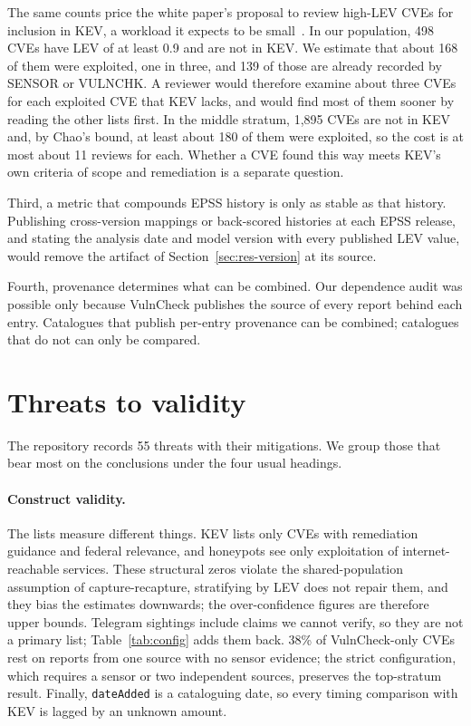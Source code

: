 The same counts price the white paper's proposal to review high-LEV CVEs for
inclusion in KEV, a workload it expects to be
small~\cite[Sec.~3.3]{mell2025lev}. In our population, 498 CVEs have LEV of at
least 0.9 and are not in KEV. We estimate that about 168 of them were
exploited, one in three, and 139 of those are already recorded by SENSOR or
VULNCHK. A reviewer would therefore examine about three CVEs for each exploited
CVE that KEV lacks, and would find most of them sooner by reading the other
lists first. In the middle stratum, 1,895 CVEs are not in KEV and, by Chao's
bound, at least about 180 of them were exploited, so the cost is at most about
11 reviews for each. Whether a CVE found this way meets KEV's own criteria of
scope and remediation is a separate question.

Third, a metric that compounds EPSS history is only as stable as that history.
Publishing cross-version mappings or back-scored histories at each EPSS release,
and stating the analysis date and model version with every published LEV value,
would remove the artifact of Section~\ref{sec:res-version} at its source.

Fourth, provenance determines what can be combined. Our dependence audit was
possible only because VulnCheck publishes the source of every report behind
each entry. Catalogues that publish per-entry provenance can be combined;
catalogues that do not can only be compared.

\section{Threats to validity}\label{sec:threats}

The repository records 55 threats with their mitigations. We group
those that bear most on the conclusions under the four usual headings.

\paragraph{Construct validity.} The lists measure different things. KEV lists
only CVEs with remediation guidance and federal relevance, and honeypots see
only exploitation of internet-reachable services. These structural zeros violate
the shared-population assumption of capture-recapture, stratifying by LEV does
not repair them, and they bias the estimates downwards; the over-confidence
figures are therefore upper bounds. Telegram sightings include claims we cannot
verify, so they are not a primary list; Table~\ref{tab:config} adds them back. 38\%
of VulnCheck-only CVEs rest on reports from one source with no sensor evidence;
the strict configuration, which requires a sensor or two independent sources,
preserves the top-stratum result.
Finally, \texttt{dateAdded} is a cataloguing date, so every timing comparison
with KEV is lagged by an unknown amount.

